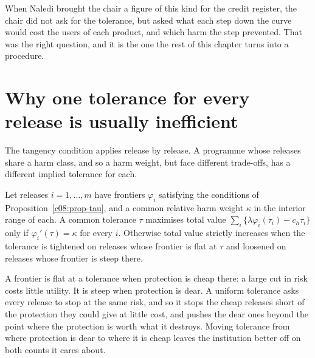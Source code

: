 When Naledi brought the chair a figure of this kind for the credit register, the
chair did not ask for the tolerance, but asked what each step
down the curve would cost the users of each product, and which harm the step
prevented. That was the right question, and it is the one the rest of this chapter
turns into a procedure.

\section{Why one tolerance for every release is usually inefficient}\label{c08:sec-uniform}

The tangency condition applies release by release. A programme whose releases share
a harm class, and so a harm weight, but face different trade-offs, has a different
implied tolerance for each.

\begin{corollary}\label{c08:cor-uniform}
Let releases $i = 1,\dots,m$ have frontiers $\varphi_i$ satisfying the conditions of
Proposition~\ref{c08:prop-tau}, and a common relative harm weight $\kappa$ in the
interior range of each. A common tolerance $\tau$ maximises total value
$\sum_i \{\lambda \varphi_i(\tau_i) - c_h \tau_i\}$ only if $\varphi_i'(\tau) =
\kappa$ for every $i$. Otherwise total value strictly increases when the tolerance
is tightened on releases whose frontier is flat at $\tau$ and loosened on releases
whose frontier is steep there.
\end{corollary}

A frontier is flat at a tolerance when protection is cheap there: a large cut in
risk costs little utility. It is steep when protection is dear. A uniform tolerance
asks every release to stop at the same risk, and so it stops the cheap releases
short of the protection they could give at little cost, and pushes the dear ones
beyond the point where the protection is worth what it destroys. Moving
tolerance from where protection is dear to where it is cheap leaves the institution
better off on both counts it cares about.

